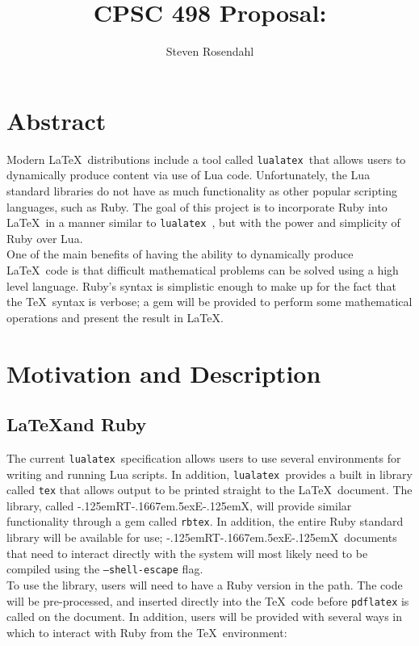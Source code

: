 \documentclass{article}
\title{CPSC 498 Proposal: \RbTeX}
\author{Steven Rosendahl}
\date{}
\newcommand{\inlinecode}[1]{\texttt{#1}}
\newcommand{\luatex}{\inlinecode{lualatex}\ }
\newcommand{\findent}{\leavevmode{\parindent=1.3em\indent}}
\def\RbTeX{{\rm\kern-.125emR\!{\scalebox{0.7}{\lower-.5ex\hbox{B}}}\!T\kern-.1667em\lower.5ex\hbox
{E}\kern-.125emX}}
\begin{document}
\maketitle
\section{Abstract}

\findent Modern \LaTeX\ distributions include a tool called \luatex that allows users to
dynamically produce content via use of Lua code. Unfortunately, the Lua standard libraries do not
have as much functionality as other popular scripting languages, such as Ruby. The goal of this
project is to incorporate Ruby into \LaTeX\ in a manner similar to \luatex, but with the power and
simplicity of Ruby over Lua.\\

One of the main benefits of having the ability to dynamically produce \LaTeX\ code is that
difficult mathematical problems can be solved using a high level language. Ruby's syntax is
simplistic enough to make up for the fact that the \TeX\ syntax is verbose; a gem will be provided
to perform some mathematical operations and present the result in \LaTeX.

\section{Motivation and Description}
\subsection{\LaTeX and Ruby}

\findent The current \luatex specification allows users to use several environments for writing
and running Lua scripts. In addition, \luatex provides a built in library called \inlinecode{tex}
that allows output to be printed straight to the \LaTeX\ document. The library, called \RbTeX,
will provide similar functionality through a gem called \inlinecode{rbtex}. In addition, the
entire Ruby standard library will be available for use; \RbTeX\ documents that need to interact
directly with the system will most likely need to be compiled using the
\inlinecode{--shell-escape} flag.\\

To use the library, users will need to have a Ruby version in the path. The code will be
pre-processed, and inserted directly into the \TeX\ code before \inlinecode{pdflatex} is called on
the document. In addition, users will be provided with several ways in which to interact with Ruby
from the \TeX\ environment:
\end{document}
